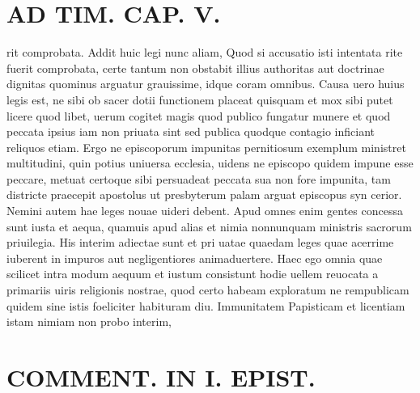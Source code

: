 \documentclass{article}
\begin{document}
\begin{pages}
\section*{AD TIM. CAP. V. }
\marginpar{[ p.159 ]}\pstart rit comprobata. Addit huic legi nunc aliam, Quod si accusatio isti intentata rite fuerit comprobata, certe tantum non obstabit illius authoritas aut doctrinae dignitas quominus arguatur grauissime, idque coram omnibus. Causa uero huius legis est, ne sibi ob sacer dotii functionem placeat quisquam et mox sibi putet licere quod libet, uerum cogitet magis quod publico fungatur munere et quod peccata ipsius iam non priuata sint sed publica quodque contagio inficiant reliquos etiam. Ergo ne episcoporum impunitas pernitiosum exemplum ministret multitudini, quin potius uniuersa ecclesia, uidens ne episcopo quidem impune esse peccare, metuat certoque sibi persuadeat peccata sua non fore impunita, tam districte praecepit apostolus ut presbyterum palam arguat episcopus syn cerior. Nemini autem hae leges nouae uideri debent. Apud omnes enim gentes concessa sunt iusta et aequa, quamuis apud alias et nimia nonnunquam ministris sacrorum priuilegia. His interim adiectae sunt et pri uatae quaedam leges quae acerrime iuberent in impuros aut negligentiores animaduertere. Haec ego omnia quae scilicet intra modum aequum et iustum consistunt hodie uellem reuocata a primariis uiris religionis nostrae, quod certo habeam exploratum ne rempublicam quidem sine istis foeliciter habituram diu. Immunitatem Papisticam et licentiam istam nimiam non probo interim,  \pend
\section*{COMMENT. IN I. EPIST. }
{}

\end{pages}
\end{document}
